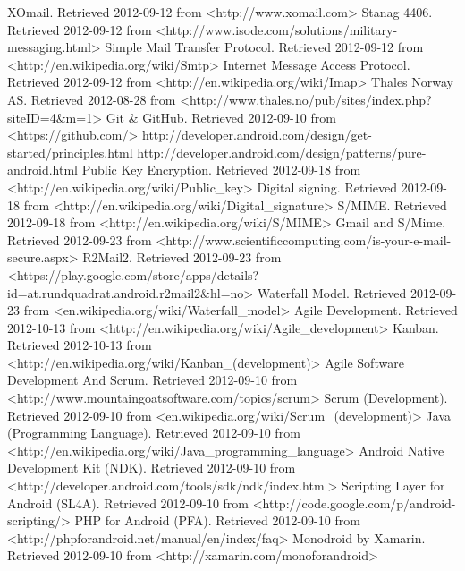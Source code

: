 \documentclass[12pt]{report}
\begin{document}
\begin{thebibliography}{99}
 XOmail. Retrieved 2012-09-12 from <http://www.xomail.com>
 Stanag 4406. Retrieved 2012-09-12 from <http://www.isode.com/solutions/military-messaging.html>
 Simple Mail Transfer Protocol. Retrieved 2012-09-12 from <http://en.wikipedia.org/wiki/Smtp>
 Internet Message Access Protocol. Retrieved 2012-09-12 from <http://en.wikipedia.org/wiki/Imap>
 Thales Norway AS. Retrieved 2012-08-28 from <http://www.thales.no/pub/sites/index.php?siteID=4\&m=1>
 Git \& GitHub. Retrieved 2012-09-10 from <https://github.com/>
 http://developer.android.com/design/get-started/principles.html
 http://developer.android.com/design/patterns/pure-android.html
 Public Key Encryption. Retrieved 2012-09-18 from <http://en.wikipedia.org/wiki/Public\_key>
 Digital signing. Retrieved 2012-09-18 from <http://en.wikipedia.org/wiki/Digital\_signature>
 S/MIME. Retrieved 2012-09-18 from <http://en.wikipedia.org/wiki/S/MIME>
 Gmail and S/Mime. Retrieved 2012-09-23 from <http://www.scientificcomputing.com/is-your-e-mail-secure.aspx>
 R2Mail2. Retrieved 2012-09-23 from <https://play.google.com/store/apps/details?id=at.rundquadrat.android.r2mail2\&hl=no>
 Waterfall Model. Retrieved 2012-09-23 from <en.wikipedia.org/wiki/Waterfall\_model>
 Agile Development. Retrieved 2012-10-13 from <http://en.wikipedia.org/wiki/Agile\_development>
 Kanban. Retrieved 2012-10-13 from <http://en.wikipedia.org/wiki/Kanban\_(development)>
 Agile Software Development And Scrum. Retrieved 2012-09-10 from <http://www.mountaingoatsoftware.com/topics/scrum>
 Scrum (Development). Retrieved 2012-09-10 from <en.wikipedia.org/wiki/Scrum\_(development)>
 Java (Programming Language). Retrieved 2012-09-10 from
<http://en.wikipedia.org/wiki/Java\_programming\_language>
 Android Native Development Kit (NDK). Retrieved 2012-09-10 from <http://developer.android.com/tools/sdk/ndk/index.html>
 Scripting Layer for Android (SL4A). Retrieved 2012-09-10 from <http://code.google.com/p/android-scripting/>
 PHP for Android (PFA). Retrieved 2012-09-10 from <http://phpforandroid.net/manual/en/index/faq>
 Monodroid by Xamarin. Retrieved 2012-09-10 from <http://xamarin.com/monoforandroid>

\end{thebibliography}
\end{document}

